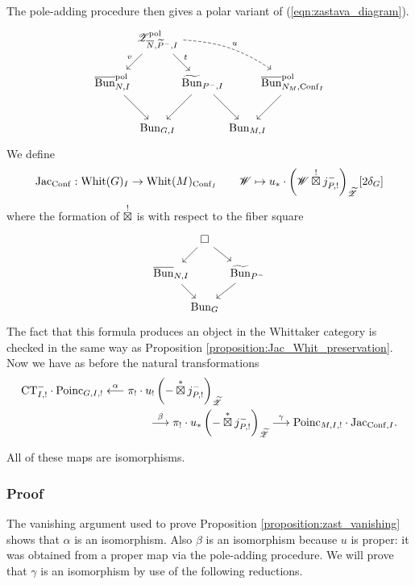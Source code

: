 \subsubsection{} The pole-adding procedure then gives a polar variant of (\ref{eqn:zastava_diagram}).
\[
\begin{tikzcd}[
  column sep={4em,between origins},
  row sep={4em,between origins}
]
     & \ZZ_{\Nc, \Pt^-, I}^\pol \arrow[dl, "v" above left] \arrow[dr, "t"] \arrow[drrr, dashed, bend left=15, "u"] & &  & \\
    \Bunc_{N,I}^\pol \arrow[dr] & & \Bunt_{P^-, I} \arrow[dl] \arrow[dr] & & \Bunc_{N_M, \Conf_I}^\pol \arrow[dl] \\
     & \Bun_{G,I} & & \Bun_{M,I} &
\end{tikzcd}
\]
We define
\[
    \mathrm{Jac}_{\mathrm{Conf}} : \mathrm{Whit}(G)_I \to \mathrm{Whit}(M)_{\mathrm{Conf}_I}
    \qquad \mathscr{W} \mapsto u_* \cdot \left( \mathscr{W} \overset{!}{\boxtimes} j_{P,!}^- \right)_{\widetilde{\mathscr{Z}}} [2 \delta_G]
\]
where the formation of $\overset{!}{\boxtimes}$ is with respect to the fiber square
    \[
    \begin{tikzcd}[
  column sep={3em,between origins},
  row sep={3em,between origins}
]
        & \square \arrow[dl] \arrow[dr] \\
      \Bunc_{N,I} \arrow[dr] & & \Bunt_{P^-} \arrow[dl] \\
       & \Bun_G
    \end{tikzcd}
    \]
The fact that this formula produces an object in the Whittaker category is checked in the same way as Proposition \ref{proposition:Jac_Whit_preservation}. Now we have as before the natural transformations
\begin{align*}
    \mathrm{CT}_{I,!}^- \cdot \mathrm{Poinc}_{G,I,!}
    & \overset{\alpha}{\longleftarrow} \pi_! \cdot u_! \left( - \overset{*}{\boxtimes} j_{P,!}^- \right)_{\widetilde{\mathscr{Z}}} \\
    & \qquad\qquad \overset{\beta}{\longrightarrow} \pi_! \cdot u_* \left( - \overset{*}{\boxtimes} j_{P,!}^- \right)_{\widetilde{\mathscr{Z}}} 
    \overset{\gamma}{\longrightarrow} \mathrm{Poinc}_{M,I,!} \cdot \mathrm{Jac}_{\mathrm{Conf},I}.
\end{align*}

\begin{proposition}
All of these maps are isomorphisms.
\end{proposition}

\subsubsection{Proof} The vanishing argument used to prove Proposition \ref{proposition:zast_vanishing} shows that $\alpha$ is an isomorphism. Also $\beta$ is an isomorphism because $u$ is proper: it was obtained from a proper map via the pole-adding procedure. We will prove that $\gamma$ is an isomorphism by use of the following reductions.

